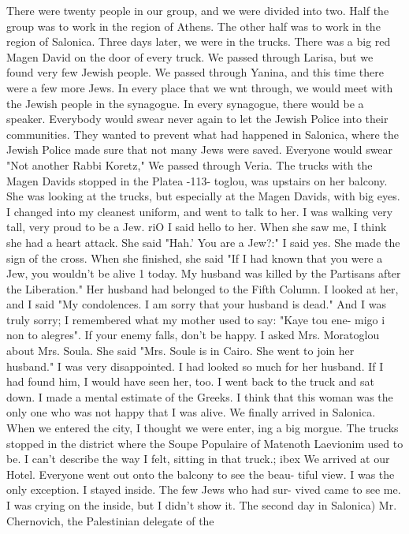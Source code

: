There were twenty people in our group, and we were divided into two. Half the group 
was to work in the region of Athens. The other half was to work in the region of 
Salonica. 
Three days later, we were in the trucks. There was a big red Magen David on the 
door of every truck. We passed through Larisa, but we found very few Jewish people. 
We passed through Yanina, and this time there were a few more Jews. In every place 
that we wnt through, we would meet with the Jewish people in the synagogue. In every 
synagogue, there would be a speaker. Everybody would swear never again to let the 
Jewish Police into their communities. They wanted to prevent what had happened in 
Salonica, where the Jewish Police made sure that not many Jews were saved. Everyone 
would swear "Not another Rabbi Koretz," 
We passed through Veria. The trucks with the Magen Davids stopped in the Platea 
-113- 
toglou, was upstairs on her balcony. She was looking at the trucks, but especially 
at the Magen Davids, with big eyes. I changed into my cleanest uniform, and went 
to talk to her. I was walking very tall, very proud to be a Jew. riO I said hello to 
her. When she saw me, I think she had a heart attack. 
She said "Hah.' You are a Jew?:" I said yes. She made the sign of the cross. 
When she finished, she said "If I had known that you were a Jew, you wouldn't be alive 1 
today. My husband was killed by the Partisans after the Liberation." Her husband had 
belonged to the Fifth Column. 
I looked at her, and I said "My condolences. I am sorry that your husband is 
dead." And I was truly sorry; I remembered what my mother used to say: "Kaye tou ene-
migo i non to alegres". If your enemy falls, don't be happy. I asked Mrs. Moratoglou 
about Mrs. Soula. She said "Mrs. Soule is in Cairo. She went to join her husband." 
I was very disappointed. I had looked so much for her husband. If I had found him, I 
would have seen her, too. 
I went back to the truck and sat down. I made a mental estimate of the Greeks. 
I think that this woman was the only one who was not happy that I was alive. 
We finally arrived in Salonica. When we entered the city, I thought we were enter, 
ing a big morgue. The trucks stopped in the district where the Soupe Populaire of 
Matenoth Laevionim used to be. I can't describe the way I felt, sitting in that truck.; 
ibex We arrived at our Hotel. Everyone went out onto the balcony to see the beau-
tiful view. I was the only exception. I stayed inside. The few Jews who had sur-
vived came to see me. I was crying on the inside, but I didn't show it. 
The second day in Salonica) Mr. Chernovich, the Palestinian delegate of the 
